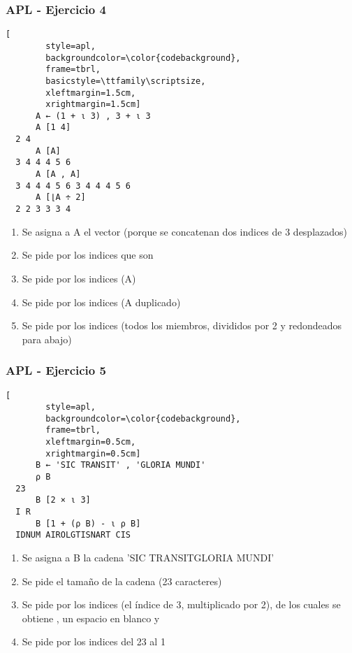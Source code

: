 \documentclass{beamer}
\let\OldTexttt\texttt
\renewcommand{\texttt}[1]{\OldTexttt{\color{magenta}{#1}}}
\begin{document}
\begin{frame}[fragile]
  \frametitle{APL - Ejercicio 4}

  \begin{center}
      \begin{lstlisting}[
        style=apl,
        backgroundcolor=\color{codebackground},
        frame=tbrl,
        basicstyle=\ttfamily\scriptsize,
        xleftmargin=1.5cm,
        xrightmargin=1.5cm]
      A ← (1 + ⍳ 3) , 3 + ⍳ 3
      A [1 4]
  2 4
      A [A]
  3 4 4 4 5 6
      A [A , A]
  3 4 4 4 5 6 3 4 4 4 5 6
      A [⌊A ÷ 2]
  2 2 3 3 3 4
      \end{lstlisting}
  \end{center}

\begin{enumerate}
  \item Se asigna a A el vector \texttt{2 3 4 4 5 6} (porque se concatenan dos indices de 3 desplazados)
  \item Se pide por los indices \texttt{1 4} que son \texttt{2 4}
  \item Se pide por los indices \texttt{2 3 4 4 5 6} (A)
  \item Se pide por los indices \texttt{2 3 4 4 5 6 2 3 4 4 5 6} (A duplicado)
  \item Se pide por los indices \texttt{1 1 2 2 2 3} (todos los miembros, divididos por 2 y redondeados para abajo)
\end{enumerate}

\end{frame}

\begin{frame}[fragile]
  \frametitle{APL - Ejercicio 5}

  \begin{center}
      \begin{lstlisting}[
        style=apl,
        backgroundcolor=\color{codebackground},
        frame=tbrl,
        xleftmargin=0.5cm,
        xrightmargin=0.5cm]
      B ← 'SIC TRANSIT' , 'GLORIA MUNDI'
      ⍴ B
  23
      B [2 × ⍳ 3]
  I R
      B [1 + (⍴ B) - ⍳ ⍴ B]
  IDNUM AIROLGTISNART CIS
      \end{lstlisting}
  \end{center}

  \begin{enumerate}
    \item Se asigna a B la cadena 'SIC TRANSITGLORIA MUNDI'
    \item Se pide el tamaño de la cadena (23 caracteres)
    \item Se pide por los indices \texttt{2 4 6} (el índice de 3, multiplicado por 2), de los cuales se obtiene \texttt{I}, un espacio en blanco y \texttt{R}
    \item Se pide por los indices del 23 al 1
  \end{enumerate}

\end{frame}
\end{document}
